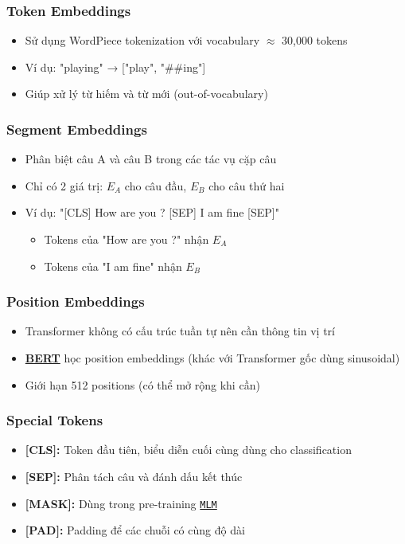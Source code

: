 \subsubsection{Token Embeddings}
\begin{itemize}
    \item Sử dụng WordPiece tokenization với vocabulary $\approx$ 30,000 tokens
    \item Ví dụ: "playing" → ["play", "\#\#ing"]
    \item Giúp xử lý từ hiếm và từ mới (out-of-vocabulary)
\end{itemize}

\subsubsection{Segment Embeddings}  
\begin{itemize}
    \item Phân biệt câu A và câu B trong các tác vụ cặp câu
    \item Chỉ có 2 giá trị: $E_A$ cho câu đầu, $E_B$ cho câu thứ hai
    \item Ví dụ: "[CLS] How are you ?
    [SEP] I am fine [SEP]"
    \begin{itemize}
        \item Tokens của "How are you ?" nhận $E_A$
        \item Tokens của "I am fine" nhận $E_B$
    \end{itemize}
\end{itemize}

\subsubsection{Position Embeddings}
\begin{itemize}
    \item Transformer không có cấu trúc tuần tự nên cần thông tin vị trí
    \item \hyperref[acro:bert]{\textbf{BERT}} học position embeddings (khác với Transformer gốc dùng sinusoidal)
    \item Giới hạn 512 positions (có thể mở rộng khi cần)
\end{itemize}

\subsubsection{Special Tokens}
\begin{itemize}
    \item \textbf{[CLS]:} Token đầu tiên, biểu
    diễn cuối cùng dùng cho classification
    \item \textbf{[SEP]:} Phân tách câu và đánh dấu kết thúc
    \item \textbf{[MASK]:} Dùng trong pre-training \hyperref[acro:mlm]{\texttt{MLM}}
    \item \textbf{[PAD]:} Padding để các chuỗi có cùng độ dài
\end{itemize}

